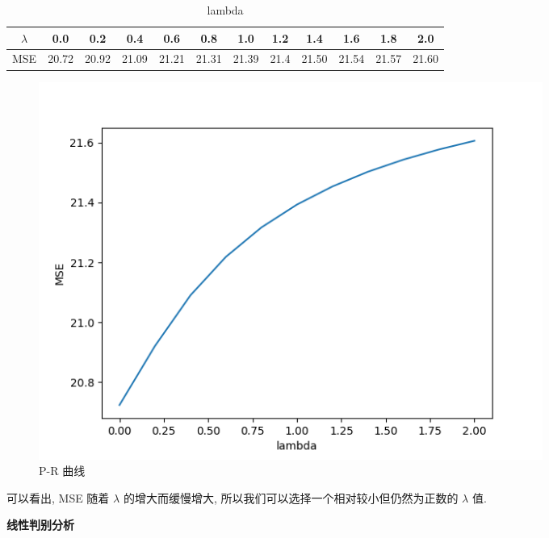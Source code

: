 \documentclass[answers]{exam}  %
\begin{document}
\begin{questions}
\begin{solution}
\begin{enumerate}
            \begin{table}[H]
              \centering
              \caption{lambda} \vspace{2mm}\label{table:roc}
              \begin{tabular}{c|c c c c c c c c c c c}\toprule
                \hline
                $\lambda$ & 0.0   & 0.2   & 0.4   & 0.6   & 0.8   & 1.0   & 1.2  & 1.4   & 1.6   & 1.8   & 2.0   \\ \midrule
                MSE       & 20.72 & 20.92 & 21.09 & 21.21 & 21.31 & 21.39 & 21.4 & 21.50 & 21.54 & 21.57 & 21.60 \\ \midrule
                \bottomrule
              \end{tabular}
            \end{table}

            \begin{figure}[H]
              \centering
              \includegraphics[width=0.8\textwidth]{Figure_1.png}
              \caption{P-R 曲线}
              \label{Fig.main1}
            \end{figure}


            可以看出, MSE 随着 $\lambda$ 的增大而缓慢增大, 所以我们可以选择一个相对较小但仍然为正数的 $\lambda$ 值.
    \end{enumerate}
  \end{solution}

  \question [20] \textbf{线性判别分析}


\end{questions}
\end{document}
